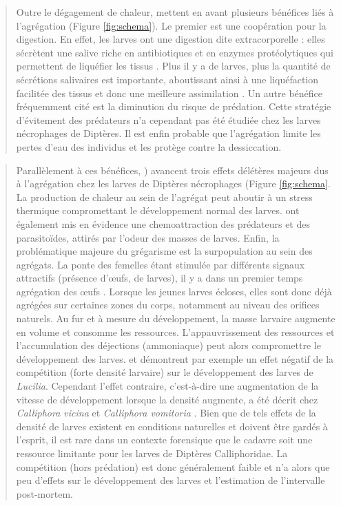 \blockquote{Outre le dégagement de chaleur, \citet{rivers_physiological_2011} mettent en avant plusieurs bénéfices liés à l’agrégation (Figure \ref{fig:schema}). Le premier est une coopération pour la digestion. En effet, les larves ont une digestion dite extracorporelle : elles sécrètent une salive riche en antibiotiques et en enzymes protéolytiques qui permettent de liquéfier les tissus \citep{sandeman_tryptic_1990, padilha_sequence_2009}. Plus il y a de larves, plus la quantité de sécrétions salivaires est importante, aboutissant ainsi à une liquéfaction facilitée
des tissus et donc une meilleure assimilation \cite{rivers_physiological_2011}. Un autre bénéfice fréquemment cité est la diminution du risque de prédation. Cette stratégie d’évitement des prédateurs n’a cependant pas été étudiée chez les larves nécrophages de Diptères. Il est enfin probable que l’agrégation limite les pertes d’eau des individus et les protège contre la dessiccation.}

\blockquote{Parallèlement à ces bénéfices, \citet{rivers_physiological_2011}) avancent trois effets délétères majeurs dus à l’agrégation chez les larves de Diptères nécrophages (Figure \ref{fig:schema}. La production de chaleur au sein de l’agrégat peut aboutir à un stress thermique compromettant le développement normal des larves. \citet{wertheim_pheromone-mediated_2005} ont également mis en évidence une chemoattraction des prédateurs et des parasitoïdes, attirés par l’odeur des masses de larves. Enfin, la problématique majeure du grégarisme est la surpopulation au sein des agrégats.
La ponte des femelles étant stimulée par différents signaux attractifs (présence d'œufs, de larves), il y a dans un premier temps agrégation des œufs \cite{esser_factors_1990}. Lorsque les jeunes larves écloses, elles sont donc déjà agrégées sur certaines zones du corps, notamment au niveau des orifices naturels. Au fur et à mesure du développement, la masse larvaire augmente en volume et consomme les ressources. L’appauvrissement des ressources et l’accumulation des déjections (ammoniaque) peut alors compromettre le développement des larves. \citet{kuusela_community_1983} et \citet{prinkkila_complex_1995} démontrent par exemple un effet négatif de la compétition (forte densité larvaire) sur le développement des larves de \textit{Lucilia}. Cependant l’effet contraire, c’est-à-dire une augmentation de la vitesse de développement lorsque la densité augmente, a été décrit chez \textit{Calliphora vicina} \cite{saunders_effects_2013} et \textit{Calliphora vomitoria} \citep{kaneshrajah_calliphora_2004, ireland_effects_2006}. Bien que de tels effets de la densité de larves existent en conditions naturelles et doivent être gardés à l’esprit, il est rare dans un contexte forensique que le cadavre soit une ressource limitante pour les larves de Diptères Calliphoridae. La compétition (hors prédation) est donc généralement faible et n’a alors que peu d’effets sur le développement des larves et l’estimation de l’intervalle post-mortem.}


